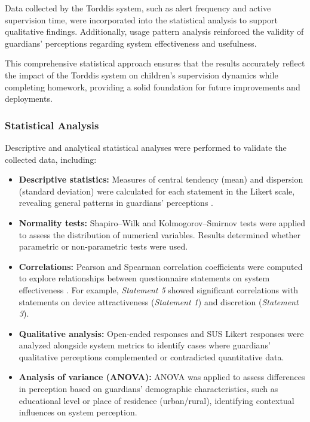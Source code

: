                 Data collected by the Torddis system, such as alert frequency and active supervision time, were incorporated into the statistical analysis to support qualitative findings. Additionally, usage pattern analysis reinforced the validity of guardians’ perceptions regarding system effectiveness and usefulness.
                
                This comprehensive statistical approach ensures that the results accurately reflect the impact of the Torddis system on children's supervision dynamics while completing homework, providing a solid foundation for future improvements and deployments.
                
                \subsubsection{Statistical Analysis}
                Descriptive and analytical statistical analyses were performed to validate the collected data, including:
                
                \begin{itemize}
                    \item \textbf{Descriptive statistics:} Measures of central tendency (mean) and dispersion (standard deviation) were calculated for each statement in the Likert scale, revealing general patterns in guardians' perceptions \citep{Yaska2024Assessment}.
                    
                    \item \textbf{Normality tests:} Shapiro–Wilk \citep{Souza2023Sample} and Kolmogorov–Smirnov \citep{Lilliefors1969Kolmogorov} tests were applied to assess the distribution of numerical variables. Results determined whether parametric or non-parametric tests were used.
                    
                    \item \textbf{Correlations:} Pearson \citep{Yu2024Inferential} and Spearman \citep{Yu2024Robust} correlation coefficients were computed to explore relationships between questionnaire statements on system effectiveness \citep{Jebb2021Review}. For example, \textit{Statement 5} showed significant correlations with statements on device attractiveness (\textit{Statement 1}) and discretion (\textit{Statement 3}).
                    
                    \item \textbf{Qualitative analysis:} Open-ended responses and SUS Likert responses were analyzed alongside system metrics to identify cases where guardians’ qualitative perceptions complemented or contradicted quantitative data.
                    
                    \item \textbf{Analysis of variance (ANOVA):} ANOVA was applied \citep{Dubey2025Two,Rojas2025Validating} to assess differences in perception based on guardians’ demographic characteristics, such as educational level or place of residence (urban/rural), identifying contextual influences on system perception.
                \end{itemize}
                
